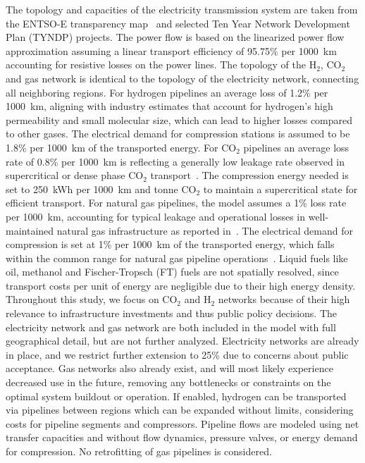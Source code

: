 \documentclass[twocolumn]{article}
\newcommand{\carbon}{CO$_2$}
\newcommand{\hydrogen}{H$_2$}
\begin{document}
The topology and capacities of the electricity transmission system are taken from the ENTSO-E transparency map~\cite{wiegmansGridkitExtractEntsoE2016} and selected Ten Year Network Development Plan (TYNDP) projects. The power flow is based on the linearized power flow approximation assuming a linear transport efficiency of 95.75\% per 1000~km accounting for resistive losses on the power lines. %
The topology of the \hydrogen{}, \carbon{} and gas network is identical to the topology of the electricity network, connecting all neighboring regions.
For hydrogen pipelines an average loss of 1.2\% per 1000~km, aligning with industry estimates that account for hydrogen's high permeability and small molecular size, which can lead to higher losses compared to other gases. The electrical demand for compression stations is assumed to be 1.8\% per 1000~km of the transported energy.
For \carbon{} pipelines an average loss rate of 0.8\% per 1000~km is reflecting a generally low leakage rate observed in supercritical or dense phase \carbon{} transport~\cite{liuExperimentalStudyLeakage2023,vitaliRisksSafetyCO22021}. The compression energy needed is set to 250~kWh per 1000~km and tonne \carbon{} to maintain a supercritical state for efficient transport. For natural gas pipelines, the model assumes a 1\% loss rate per 1000~km, accounting for typical leakage and operational losses in well-maintained natural gas infrastructure as reported in~\cite{NaturalGasTransmission2021}. The electrical demand for compression is set at 1\% per 1000~km of the transported energy, which falls within the common range for natural gas pipeline operations~\cite{mcvayreneeMethaneEmissionsGas2023}.
%
Liquid fuels like oil, methanol and Fischer-Tropsch (FT) fuels are not spatially resolved, since transport costs per unit of energy are negligible due to their high energy density. Throughout this study, we focus on \carbon{} and \hydrogen{} networks because of their high relevance to infrastructure investments and thus public policy decisions. The electricity network and gas network are both included in the model with full geographical detail, but are not further analyzed. Electricity networks are already in place, and we restrict further extension to 25\% due to concerns about public acceptance. Gas networks also already exist, and will most likely experience decreased use in the future, removing any bottlenecks or constraints on the optimal system buildout or operation.
If enabled, hydrogen can be transported via pipelines between regions which can be expanded without limits, considering costs for pipeline segments and compressors. Pipeline flows are modeled using net transfer capacities and without flow dynamics, pressure valves, or energy demand for compression. No retrofitting of gas pipelines is considered.
\end{document}
